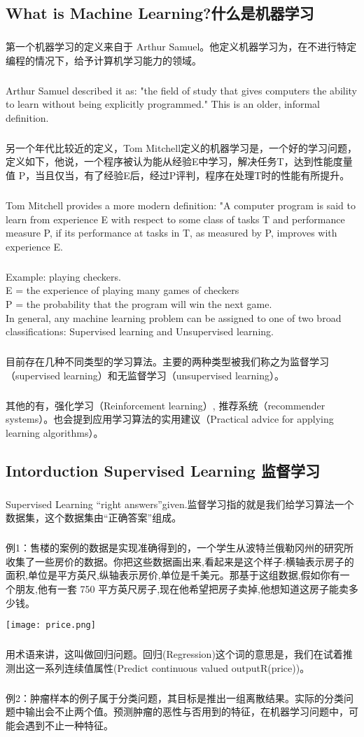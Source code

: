 \documentclass{article}
\begin{document}
\begin{CJK}{UTF8}{gbsn}
\subsection{What is Machine Learning?什么是机器学习}
\subparagraph*{}
第一个机器学习的定义来自于 Arthur Samuel。他定义机器学习为，在不进行特定编程的情况下，给予计算机学习能力的领域。
\subparagraph*{}
 Arthur Samuel described it as: "the field of study that gives computers the ability to learn without being explicitly programmed." This is an older, informal definition.
\subparagraph*{}
另一个年代比较近的定义，Tom Mitchell定义的机器学习是，一个好的学习问题，定义如下，他说，一个程序被认为能从经验E中学习，解决任务T，达到性能度量值 P，当且仅当，有了经验E后，经过P评判，程序在处理T时的性能有所提升。
\subparagraph*{}
Tom Mitchell provides a more modern definition: "A computer program is said to learn from experience E with respect to some class of tasks T and performance measure P, if its performance at tasks in T, as measured by P, improves with experience E.
\subparagraph*{}
Example: playing checkers.\\
E = the experience of playing many games of checkers\\
P = the probability that the program will win the next game.\\
In general, any machine learning problem can be assigned to one of two broad classifications:
Supervised learning and Unsupervised learning.\\
\subparagraph*{}
目前存在几种不同类型的学习算法。主要的两种类型被我们称之为监督学习（supervised learning）和无监督学习（unsupervised learning）。
\subparagraph*{}
其他的有，强化学习（Reinforcement learning）, 推荐系统（recommender systems）。也会提到应用学习算法的实用建议（Practical advice for applying learning algorithms）。
\subsection{Intorduction Supervised Learning 监督学习}
\subparagraph*{}
Supervised Learning ``right answers''given.监督学习指的就是我们给学习算法一个数据集，这个数据集由“正确答案”组成。
\subparagraph*{}
例1：售楼的案例的数据是实现准确得到的，一个学生从波特兰俄勒冈州的研究所收集了一些房价的数据。你把这些数据画出来,看起来是这个样子:横轴表示房子的面积,单位是平方英尺,纵轴表示房价,单位是千美元。那基于这组数据,假如你有一个朋友,他有一套 750 平方英尺房子,现在他希望把房子卖掉,他想知道这房子能卖多少钱。

\texttt{[image: price.png]}
\subparagraph*{}
用术语来讲，这叫做回归问题。回归(Regression)这个词的意思是，我们在试着推测出这一系列连续值属性(Predict continuous valued outputR(price))。
\subparagraph*{}
例2：肿瘤样本的例子属于分类问题，其目标是推出一组离散结果。实际的分类问题中输出会不止两个值。预测肿瘤的恶性与否用到的特征，在机器学习问题中，可能会遇到不止一种特征。


\end{CJK}
\end{document}
